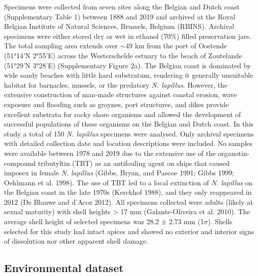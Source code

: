 \documentclass[smallextended]{svjour3}       %
\begin{document}
Specimens were collected from seven sites along the Belgian and Dutch
coast (Supplementary Table 1) between 1888 and 2019 and archived at the
Royal Belgian Institute of Natural Sciences, Brussels, Belgium (RBINS).
Archival specimens were either stored dry or wet in ethanol (70\%)
filled preservation jars. The total sampling area extends over
\(\sim49\) km from the port of Oostende (51°14'N 2°55'E) across the
Westerschelde estuary to the beach of Zoutelande (51°29'N 3°28'E)
(Supplementary Figure 2a). The Belgian coast is dominated by wide sandy
beaches with little hard substratum, rendering it generally unsuitable
habitat for barnacles, mussels, or the predatory \emph{N. lapillus}.
However, the extensive construction of man-made structures against
coastal erosion, wave exposure and flooding such as groynes, port
structures, and dikes provide excellent substrata for rocky shore
organisms and allowed the development of successful populations of these
organisms on the Belgian and Dutch coast. In this study a total of 150
\emph{N. lapillus} specimens were analysed. Only archival specimens with
detailed collection date and location descriptions were included. No
samples were available between 1978 and 2019 due to the extensive use of
the organotin-compound tributyltin (TBT) as an antifouling agent on
ships that caused imposex in female \emph{N. lapillus} (Gibbs, Bryan,
and Pascoe 1991; Gibbs 1999; Oehlmann et al. 1998). The use of TBT led
to a local extinction of \emph{N. lapillus} on the Belgian coast in the
late 1970s (Kerckhof 1988), and they only reappeared in 2012 (De Blauwe
and d'Acoz 2012). All specimens collected were adults (likely at sexual
maturity) with shell heights \textgreater{} 17 mm (Galante-Oliveira et
al. 2010). The average shell height of selected specimens was 28.2 ±
2.73 mm (1\(\sigma\)). Shells selected for this study had intact apices
and showed no exterior and interior signs of dissolution nor other
apparent shell damage.

\hypertarget{environmental-dataset}{%
\subsection{Environmental dataset}\label{environmental-dataset}}
\end{document}
